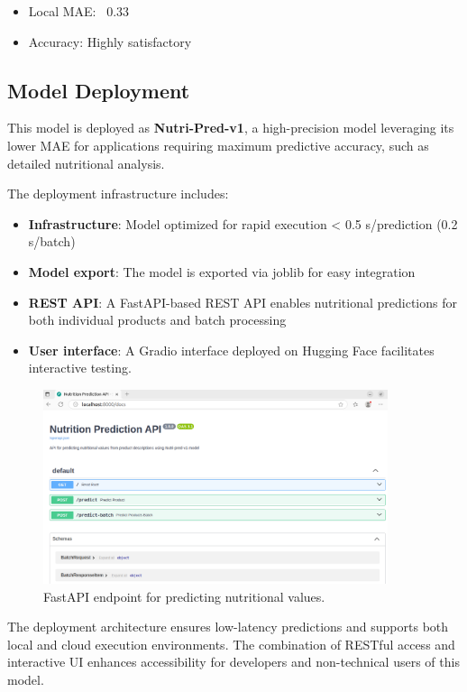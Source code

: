 \begin{itemize}
    \small
    \item Local MAE: ~0.33
    \item Accuracy: Highly satisfactory
\end{itemize}
\thispagestyle{fancy}
\subsection{Model Deployment}
This model is deployed as \textbf{Nutri-Pred-v1}, a high-precision model leveraging its lower MAE for applications requiring maximum predictive accuracy, such as detailed nutritional analysis.

The deployment infrastructure includes:
\begin{itemize}
    \item \textbf{Infrastructure}: Model optimized for rapid execution < 0.5 s/prediction (0.2 s/batch)
    \item \textbf{Model export}: The model is exported via joblib for easy integration
    \item \textbf{REST API}: A FastAPI-based REST API enables nutritional predictions for both individual products and batch processing
    \item \textbf{User interface}: A Gradio interface deployed on Hugging Face
facilitates interactive testing\footnotemark.
\end{itemize}


\begin{figure}[H]
    \centering
    \includegraphics[width=0.90\textwidth]{images/Nutri-pred_fast_API.png}
    \caption{FastAPI endpoint for predicting nutritional values.}
    \label{fig:fastapi-endpoint}
\end{figure}

\vspace{1cm}
The deployment architecture ensures low-latency predictions and supports both local and cloud execution environments. The combination of RESTful access and interactive UI enhances accessibility for developers and non-technical users of this model.


